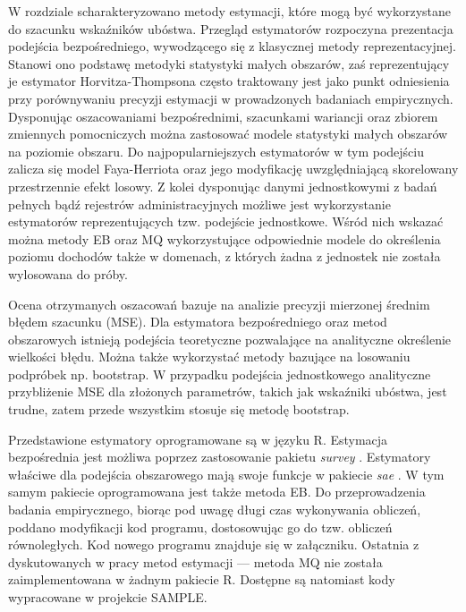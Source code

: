 W rozdziale scharakteryzowano metody estymacji, które mogą być wykorzystane do szacunku wskaźników ubóstwa. Przegląd estymatorów rozpoczyna prezentacja podejścia bezpośredniego, wywodzącego się z klasycznej metody reprezentacyjnej. Stanowi ono podstawę metodyki statystyki małych obszarów, zaś reprezentujący je estymator Horvitza-Thompsona często traktowany jest jako punkt odniesienia przy porównywaniu precyzji estymacji w prowadzonych badaniach empirycznych. Dysponując oszacowaniami bezpośrednimi, szacunkami wariancji oraz zbiorem zmiennych pomocniczych można zastosować modele statystyki małych obszarów na poziomie obszaru. Do najpopularniejszych estymatorów w tym podejściu zalicza się model Faya-Herriota oraz jego modyfikację uwzględniającą skorelowany przestrzennie efekt losowy. Z kolei dysponując danymi jednostkowymi z badań pełnych bądź rejestrów administracyjnych możliwe jest wykorzystanie estymatorów reprezentujących tzw. podejście jednostkowe. Wśród nich wskazać można metody EB oraz MQ wykorzystujące odpowiednie modele do określenia poziomu dochodów także w domenach, z których żadna z jednostek nie została wylosowana do próby.

Ocena otrzymanych oszacowań bazuje na analizie precyzji mierzonej średnim błędem szacunku (MSE). Dla estymatora bezpośredniego oraz metod obszarowych istnieją podejścia teoretyczne pozwalające na analityczne określenie wielkości błędu. Można także wykorzystać metody bazujące na losowaniu podpróbek np. bootstrap. W przypadku podejścia jednostkowego analityczne przybliżenie MSE dla złożonych parametrów, takich jak wskaźniki ubóstwa, jest trudne, zatem przede wszystkim stosuje się metodę bootstrap. 

Przedstawione estymatory oprogramowane są w języku R. Estymacja bezpośrednia jest możliwa poprzez zastosowanie pakietu \textit{survey} \citep{survey2016}. Estymatory właściwe dla podejścia obszarowego mają swoje funkcje w pakiecie \textit{sae} \citep{molina-marhuenda2015}. W tym samym pakiecie oprogramowana jest także metoda EB. Do przeprowadzenia badania empirycznego, biorąc pod uwagę długi czas wykonywania obliczeń, poddano modyfikacji kod programu, dostosowując go do tzw. obliczeń równoległych. Kod nowego programu znajduje się w załączniku. Ostatnia z dyskutowanych w pracy metod estymacji --- metoda MQ nie została zaimplementowana w żadnym pakiecie R. Dostępne są natomiast kody wypracowane w projekcie SAMPLE. 
